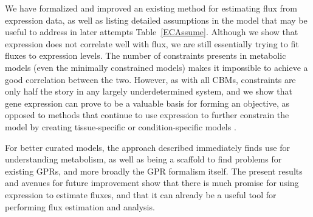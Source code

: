 We have formalized and improved an existing method for estimating flux
from expression data, as well as listing detailed assumptions in the
model that may be useful to address in later attempts
Table~\ref{ECAssume}.  Although we show that expression does not
correlate well with flux, we are still essentially trying to fit
fluxes to expression levels.  The number of constraints presents in
metabolic models (even the minimally constrained models) makes it
impossible to achieve a good correlation between the two. However, as
with all CBMs, constraints are only half the story in any largely
underdetermined system, and we show that gene expression can prove to
be a valuable basis for forming an objective, as opposed to methods
that continue to use expression to further constrain the model by
creating tissue-specific or condition-specific models
\citep{Shlomi2008,Becker2008}.

For better curated models, the approach described immediately finds
use for understanding metabolism, as well as being a scaffold to find
problems for existing GPRs, and more broadly the GPR formalism itself.
The present results and avenues for future improvement
show that there is much promise for using expression to estimate
fluxes, and that it can already be a useful tool for performing flux
estimation and analysis.

